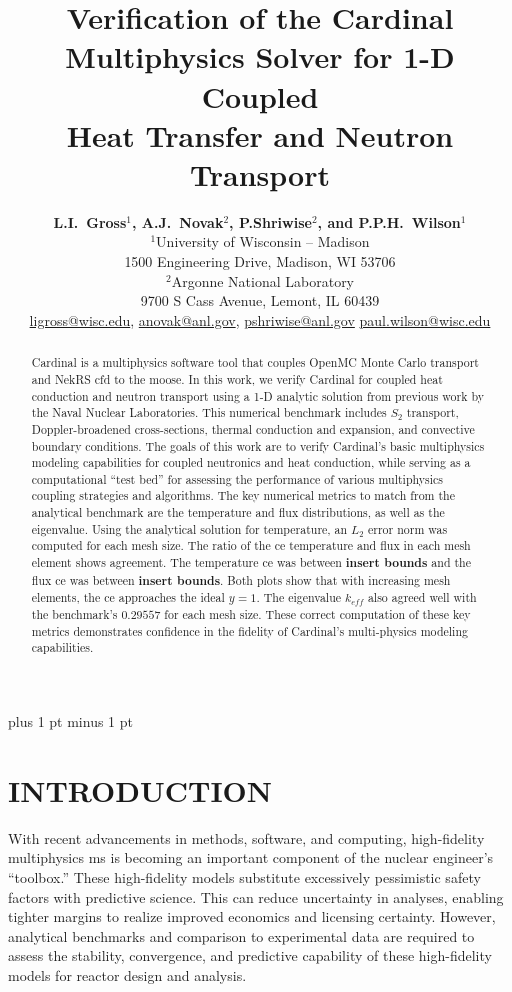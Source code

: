 \documentclass[letterpaper]{mc2023}
\title{Verification of the Cardinal Multiphysics Solver for 1-D Coupled\\
Heat Transfer and Neutron Transport}
\author{%
  \textbf{L.I.~Gross$^1$, A.J.~Novak$^2$, P.Shriwise$^2$, and P.P.H.~Wilson$^1$}\\
  $^1$University of Wisconsin -- Madison  \\
  1500 Engineering Drive, Madison, WI 53706 \vspace{6pt}\\
  $^2$Argonne National Laboratory \\
  9700 S Cass Avenue, Lemont, IL 60439\vspace{6pt} \\
  \url{ligross@wisc.edu}, \url{anovak@anl.gov}, \url{pshriwise@anl.gov} \url{paul.wilson@wisc.edu}
}
\begin{document}
\maketitle
\justify
\parskip 6pt plus 1 pt minus 1 pt

\begin{abstract}
  Cardinal is a multiphysics software tool that couples OpenMC Monte Carlo transport and NekRS \gls{cfd} to the \gls{moose}.
  In this work, we verify Cardinal for coupled heat conduction and neutron transport using a 1-D analytic solution from previous
  work by the Naval Nuclear Laboratories. This numerical benchmark includes $S_2$ transport, Doppler-broadened cross-sections,
  thermal conduction and expansion, and convective boundary conditions. The goals of this work are to verify Cardinal's basic
  multiphysics modeling capabilities for coupled neutronics and heat conduction, while serving as a computational ``test bed''
  for assessing the performance of various multiphysics coupling strategies and algorithms. The key numerical metrics to match
  from the analytical benchmark are the temperature and flux distributions, as well as the eigenvalue. Using the analytical
  solution for temperature, an $L_{2}$ error norm was computed for each mesh size.
  The ratio of the \gls{ce} temperature and flux in each mesh element shows agreement.  The temperature \gls{ce} was between
  \textbf{insert bounds} and the flux \gls{ce} was between \textbf{insert bounds}. Both plots show that with increasing mesh elements, the \gls{ce}
  approaches the ideal $y=1$. The eigenvalue $k_{eff}$ also agreed well with the benchmark's $0.29557$ for each mesh size.
  These correct computation of these key metrics demonstrates confidence in the fidelity of Cardinal's multi-physics modeling
  capabilities.
\end{abstract}
\vspace{6pt}

\section{INTRODUCTION}
\label{sec:intro}
With recent advancements in methods, software, and computing, high-fidelity multiphysics \gls{ms} is becoming an important
component of the nuclear engineer's ``toolbox.'' These high-fidelity models substitute excessively pessimistic safety factors
with predictive science. This can reduce uncertainty in analyses, enabling tighter margins to realize improved economics
and licensing certainty. However, analytical benchmarks and comparison to experimental data are required to assess the stability,
convergence, and predictive capability of these high-fidelity models for reactor design and analysis.
\end{document}
